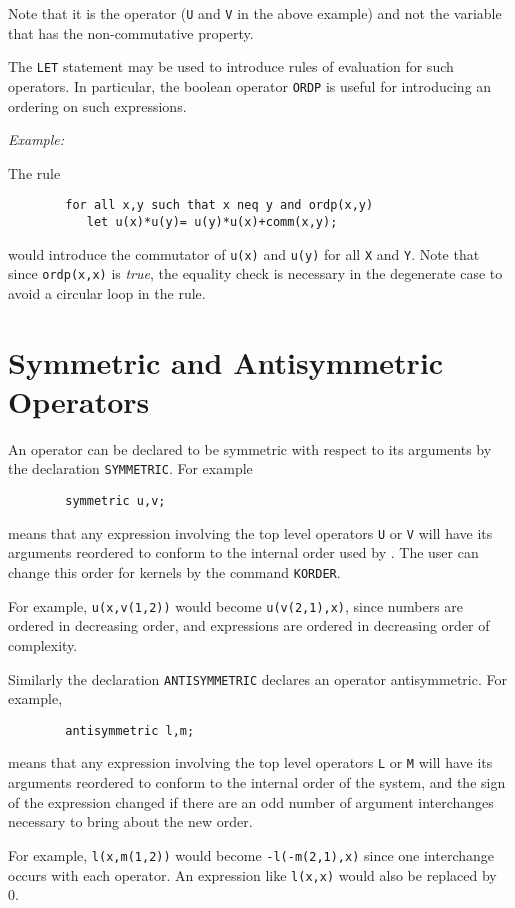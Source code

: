 Note that it is the operator ({\tt U} and {\tt V} in the above example)
and not the variable that has the non-commutative property.

The {\tt LET} statement may be used to introduce rules of
evaluation for such operators.  In particular, the boolean operator
{\tt ORDP} is useful for introducing an ordering on such
expressions.

{\it Example:}

The rule
\begin{verbatim}
        for all x,y such that x neq y and ordp(x,y)
           let u(x)*u(y)= u(y)*u(x)+comm(x,y);
\end{verbatim}
would introduce the commutator of {\tt u(x)} and {\tt u(y)} for all
{\tt X} and {\tt Y}.  Note that since {\tt ordp(x,x)} is {\em true}, the
equality check is necessary in the degenerate case to avoid a circular
loop in the rule.

\section{Symmetric and Antisymmetric Operators}

An operator can be declared to be symmetric with respect to its arguments
by the declaration {\tt SYMMETRIC}. For example
\begin{verbatim}
        symmetric u,v;
\end{verbatim}
means that any expression involving the top level operators {\tt U} or
{\tt V} will have its arguments reordered to conform to the internal order
used by {\REDUCE}.  The user can change this order for kernels by the
command {\tt KORDER}.

For example, {\tt u(x,v(1,2))} would become {\tt u(v(2,1),x)}, since
numbers are ordered in decreasing order, and expressions are ordered in
decreasing order of complexity.

Similarly the declaration {\tt ANTISYMMETRIC}
declares an operator antisymmetric.   For example,
\begin{verbatim}
        antisymmetric l,m;
\end{verbatim}
means that any expression involving the top level operators {\tt L} or
{\tt M} will have its arguments reordered to conform to the internal order
of the system, and the sign of the expression changed if there are an odd
number of argument interchanges necessary to bring about the new order.

For example, {\tt l(x,m(1,2))} would become {\tt -l(-m(2,1),x)} since one
interchange occurs with each operator.  An expression like {\tt l(x,x)}
would also be replaced by 0.

